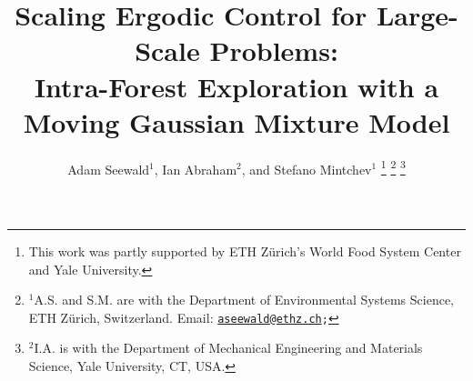 \documentclass[letterpaper,10pt,conference,twoside]{IEEEtran}
\theoremstyle{definition}
\begin{document}

\title{\LARGE\bf Scaling Ergodic Control for Large-Scale Problems:\\Intra-Forest Exploration with a Moving Gaussian Mixture Model}

\author{Adam Seewald${}^{\text{1}}$, Ian Abraham${}^{\text{2}}$, and Stefano Mintchev${}^{\text{1}}$
  \thanks{This work was partly supported by ETH Z{\"u}rich's World Food System Center and Yale University.}
  \thanks{${}^{\text{1}}$A.\hspace*{.4ex}S. and S.\hspace*{.4ex}M. are with the Department of Environmental Systems Science, ETH Z{\"u}rich, Switzerland. Email: {\tt\footnotesize \href{mailto:aseewald@ethz.ch}{aseewald@ethz.ch};}}
  \thanks{${}^{\text{2}}$I.\hspace*{.4ex}A. is with the Department of Mechanical Engineering and Materials Science, Yale University, CT, USA.}
}

\maketitle

\vspace*{-.5cm}
\begin{abstract}
\end{abstract}



\end{document}
